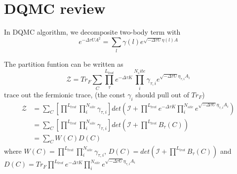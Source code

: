 \documentclass{article}
\begin{document}
    \section{DQMC review}
    In DQMC algorithm, we decomposite two-body term with
    \begin{equation}
        e^{-\Delta\tau U A^{2}} = \sum_{l} \gamma(l) e^{\sqrt{-\Delta\tau U} \eta(l) A}
    \end{equation}

    The partition funtion can be written as
    \begin{equation}
        \mathcal{Z} = Tr_{F} \sum_{C} \prod^{L_{trot}}_{\tau} e^{-\Delta\tau K} 
        \prod^{N_site}_{i} \gamma_{\tau, i} e^{\sqrt{-\Delta\tau U} \eta_{\tau, i} A_{i} }
    \end{equation}
    trace out the fermionic trace, (the const $\gamma_{i}$ should pull out of $Tr_{F}$)
    \begin{equation}
        \begin{aligned}
            \mathcal{Z} &= \sum_{C} \left[\prod^{L_{trot}} \prod^{N_{site}}_{i} \gamma_{\tau,i}\right]
            det(\mathcal{I} + \prod^{L_{trot}} e^{-\Delta\tau K}  \prod^{N_{site}}_{i} e^{\sqrt{-\Delta\tau U} \eta_{\tau, i} A_{i}})\\
            &= \sum_{C} \left[\prod^{L_{trot}} \prod^{N_{site}}_{i} \gamma_{\tau,i}\right]
            det(\mathcal{I} + \prod^{L_{trot}} B_{\tau}(C)) \\
            &= \sum_{C} W(C) D(C)
        \end{aligned}
    \end{equation}
    where $W(C) = \prod^{L_{trot}} \prod^{N_{site}}_{i} \gamma_{\tau,i}$, 
    $D(C)=det(\mathcal{I} + \prod^{L_{trot}} B_{\tau}(C))$ and
    $D(C)= Tr_{F} \prod^{L_{trot}} e^{-\Delta\tau K}  \prod^{N_{site}}_{i} e^{\sqrt{-\Delta\tau U} \eta_{\tau, i} A_{i}}$
\end{document}
